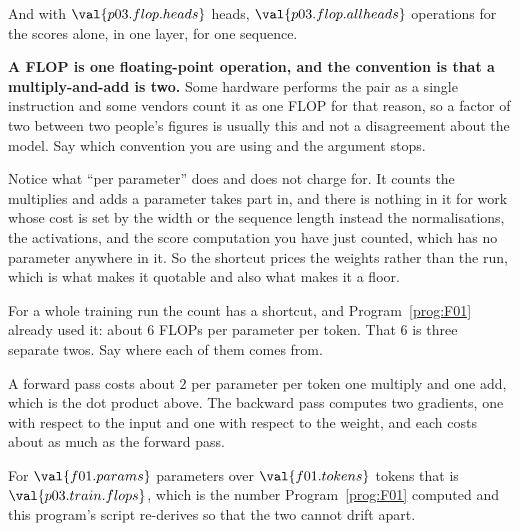 \begin{fr}
And with $\val{p03.flop.heads}$ heads, $\val{p03.flop.allheads}$ operations
\dash{} for the scores alone, in one layer, for one sequence.

\begin{note}
\textbf{A FLOP is one floating-point operation, and the convention is that a
multiply-and-add is two.} Some hardware performs the pair as a single
instruction and some vendors count it as one FLOP for that reason, so a factor
of two between two people's figures is usually this and not a disagreement
about the model. Say which convention you are using and the argument stops.
\end{note}

Notice what \enquote{per parameter} does and does not charge for. It counts the
multiplies and adds a parameter takes part in, and there is nothing in it for
work whose cost is set by the width or the sequence length instead \dash{} the
normalisations, the activations, and the score computation you have just
counted, which has no parameter anywhere in it. So the shortcut prices the
weights rather than the run, which is what makes it quotable and also what
makes it a floor.

For a whole training run the count has a shortcut, and Program~\ref{prog:F01}
already used it: about $6$ FLOPs per parameter per token. That $6$ is three
separate twos. Say where each of them comes from.
\dotline
\nextframe
\end{fr}

\begin{fr}

A forward pass costs about $2$ per parameter per token \dash{} one multiply
and one add, which is the dot product above. The backward pass computes two
gradients, one with respect to the input and one with respect to the weight,
and each costs about as much as the forward pass.

For $\val{f01.params}$ parameters over $\val{f01.tokens}$ tokens that is
$\val{p03.train.flops}$, which is the number Program~\ref{prog:F01} computed
and this program's script re-derives so that the two cannot drift apart.
\end{fr}

